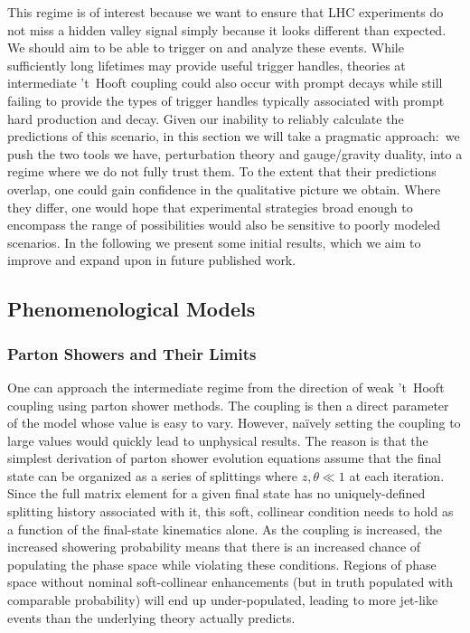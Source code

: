 This regime is of interest because we want to ensure that LHC experiments do not miss a hidden valley signal simply because it looks different than expected. We should aim to be able to trigger on and analyze these events. While sufficiently long lifetimes may provide useful trigger handles, theories at intermediate 't~Hooft coupling could also occur with prompt decays while still failing to provide the types of trigger handles typically associated with prompt hard production and decay. Given our inability to reliably calculate the predictions of this scenario, in this section we will take a pragmatic approach:~we push the two tools we have, perturbation theory and gauge/gravity duality, into a regime where we do not fully trust them. To the extent that their predictions overlap, one could gain confidence in the qualitative picture we obtain. Where they differ, one would hope that experimental strategies broad enough to encompass the range of possibilities would also be sensitive to poorly modeled scenarios. In the following we present some initial results, which we aim to improve and expand upon in future published work.

\subsection{Phenomenological Models}

\subsubsection{Parton Showers and Their Limits}

One can approach the intermediate regime from the direction of weak 't~Hooft coupling using parton shower methods. The coupling is then a direct parameter of the model whose value is easy to vary. However, na\"ively setting the coupling to large values would quickly lead to unphysical results. The reason is that the simplest derivation of parton shower evolution equations assume that the final state can be organized as a series of splittings where $z, \theta \ll 1$ at each iteration. Since the full matrix element for a given final state has no uniquely-defined splitting history associated with it, this soft, collinear condition needs to hold as a function of the final-state kinematics alone. As the coupling is increased, the increased showering probability means that there is an increased chance of populating the phase space while violating these conditions. Regions of phase space without nominal soft-collinear enhancements (but in truth populated with comparable probability) will end up under-populated, leading to more jet-like events than the underlying theory actually predicts.

